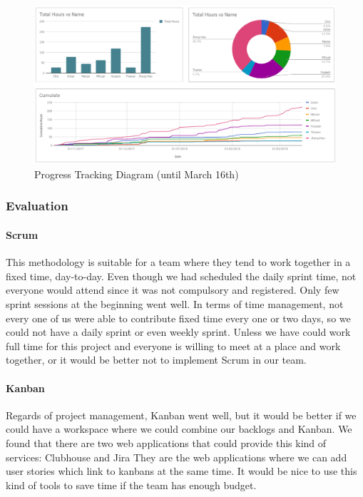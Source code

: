 \documentclass[12pt,a4paper]{article}
\begin{document}
          \begin{figure}[H]
            \centering
            \includegraphics[width=1\textwidth]{../assets/development-records-progress-tracking-diagram.png}
            \caption{Progress Tracking Diagram (until March 16th)}
            \label{fig:Progress Tracking Diagram}
          \end{figure}

      \subsubsection{Evaluation}

        \paragraph{Scrum} This methodology is suitable for a team where they tend to work together in a fixed time, day-to-day. Even though we had scheduled the daily sprint time, not everyone would attend since it was not compulsory and registered. Only few sprint sessions at the beginning went well. In terms of time management, not every one of us were able to contribute fixed time every one or two days, so we could not have a daily sprint or even weekly sprint. Unless we have could work full time for this project and everyone is willing to meet at a place and work together, or it would be better not to implement Scrum in our team. 
        
        \paragraph{Kanban} Regards of project management, Kanban went well, but it would be better if we could have a workspace where we could combine our backlogs and Kanban. We found that there are two web applications that could provide this kind of services: Clubhouse and Jira They are the web applications where we can add user stories which link to kanbans at the same time. It would be nice to use this kind of tools to save time if the team has enough budget.
        
\end{document}
